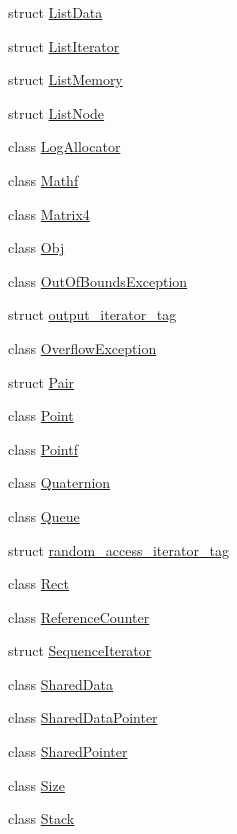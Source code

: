 \begin{DoxyCompactItemize}
struct \hyperlink{structprism_1_1_list_data}{List\+Data}
\item 
struct \hyperlink{structprism_1_1_list_iterator}{List\+Iterator}
\item 
struct \hyperlink{structprism_1_1_list_memory}{List\+Memory}
\item 
struct \hyperlink{structprism_1_1_list_node}{List\+Node}
\item 
class \hyperlink{classprism_1_1_log_allocator}{Log\+Allocator}
\item 
class \hyperlink{classprism_1_1_mathf}{Mathf}
\item 
class \hyperlink{classprism_1_1_matrix4}{Matrix4}
\item 
class \hyperlink{classprism_1_1_obj}{Obj}
\item 
class \hyperlink{classprism_1_1_out_of_bounds_exception}{Out\+Of\+Bounds\+Exception}
\item 
struct \hyperlink{structprism_1_1output__iterator__tag}{output\+\_\+iterator\+\_\+tag}
\item 
class \hyperlink{classprism_1_1_overflow_exception}{Overflow\+Exception}
\item 
struct \hyperlink{structprism_1_1_pair}{Pair}
\item 
class \hyperlink{classprism_1_1_point}{Point}
\item 
class \hyperlink{classprism_1_1_pointf}{Pointf}
\item 
class \hyperlink{classprism_1_1_quaternion}{Quaternion}
\item 
class \hyperlink{classprism_1_1_queue}{Queue}
\item 
struct \hyperlink{structprism_1_1random__access__iterator__tag}{random\+\_\+access\+\_\+iterator\+\_\+tag}
\item 
class \hyperlink{classprism_1_1_rect}{Rect}
\item 
class \hyperlink{classprism_1_1_reference_counter}{Reference\+Counter}
\item 
struct \hyperlink{structprism_1_1_sequence_iterator}{Sequence\+Iterator}
\item 
class \hyperlink{classprism_1_1_shared_data}{Shared\+Data}
\item 
class \hyperlink{classprism_1_1_shared_data_pointer}{Shared\+Data\+Pointer}
\item 
class \hyperlink{classprism_1_1_shared_pointer}{Shared\+Pointer}
\item 
class \hyperlink{classprism_1_1_size}{Size}
\item 
class \hyperlink{classprism_1_1_stack}{Stack}

\end{DoxyCompactItemize}
